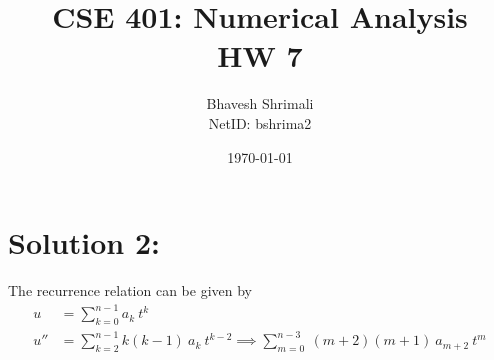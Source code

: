 
\title{\bf CSE 401: Numerical Analysis \\ HW 7}
\author{Bhavesh Shrimali \\ NetID: bshrima2}
\date{\today}
\titlespacing*{\title}{-2ex}{*-2ex}{-2ex}

\maketitle
\section*{Solution 2: }
The recurrence relation can be given by 
\begin{align*}
u & = \sum_{k=0}^{n-1} a_k\ t^{k} \\
u'' & = \sum_{k=2}^{n-1} k (k-1)\ a_k\ t^{k-2}\implies \sum_{m=0}^{n-3}\ (m+2)(m+1)\ a_{m+2}\ t^m
\end{align*}
